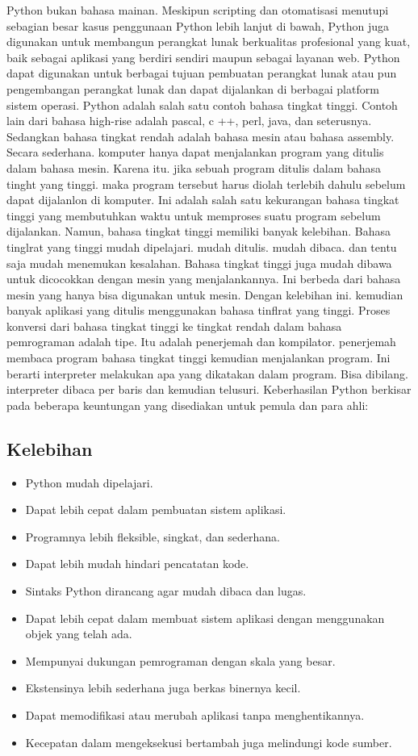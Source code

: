 	Python bukan bahasa mainan. Meskipun scripting dan otomatisasi menutupi sebagian besar kasus penggunaan Python lebih lanjut di bawah, Python juga digunakan untuk membangun perangkat lunak berkualitas profesional yang kuat, baik sebagai aplikasi yang berdiri sendiri maupun sebagai layanan web.
	Python dapat digunakan untuk berbagai tujuan pembuatan perangkat lunak atau pun pengembangan perangkat lunak dan dapat dijalankan di berbagai platform sistem operasi. Python adalah salah satu contoh bahasa tingkat tinggi. 
	Contoh lain dari bahasa high-rise adalah pascal, c ++, perl, java, dan seterusnya. Sedangkan bahasa tingkat rendah adalah bahasa mesin atau bahasa assembly. 
	Secara sederhana. komputer hanya dapat menjalankan program yang ditulis dalam bahasa mesin. Karena itu. jika sebuah program ditulis dalam bahasa tinght yang tinggi. maka program tersebut harus diolah terlebih dahulu sebelum dapat dijalanlon di komputer. 
	Ini adalah salah satu kekurangan bahasa tingkat tinggi yang membutuhkan waktu untuk memproses suatu program sebelum dijalankan. Namun, bahasa tingkat tinggi memiliki banyak kelebihan. Bahasa tinglrat yang tinggi mudah dipelajari. mudah ditulis. mudah dibaca. dan tentu saja mudah menemukan kesalahan. Bahasa tingkat tinggi juga mudah dibawa untuk dicocokkan dengan mesin yang menjalankannya. 
	Ini berbeda dari bahasa mesin yang hanya bisa digunakan untuk mesin. Dengan kelebihan ini. kemudian banyak aplikasi yang ditulis menggunakan bahasa tinflrat yang tinggi. 
	Proses konversi dari bahasa tingkat tinggi ke tingkat rendah dalam bahasa pemrograman adalah tipe. Itu adalah penerjemah dan kompilator. penerjemah membaca program bahasa tingkat tinggi kemudian menjalankan program. 
	Ini berarti interpreter melakukan apa yang dikatakan dalam program. Bisa dibilang. interpreter dibaca per baris dan kemudian telusuri.
	Keberhasilan Python berkisar pada beberapa keuntungan yang disediakan untuk pemula dan para ahli:
	
	\subsection{Kelebihan}
		\begin{itemize}
			\item Python mudah dipelajari.
			\item Dapat lebih cepat dalam pembuatan sistem aplikasi.
			\item Programnya lebih fleksible, singkat, dan sederhana.
			\item Dapat lebih mudah hindari pencatatan kode.
			\item Sintaks Python dirancang agar mudah dibaca dan lugas.
			\item Dapat lebih cepat dalam membuat sistem aplikasi dengan menggunakan objek yang telah ada.
			\item Mempunyai dukungan pemrograman dengan skala yang besar.
			\item Ekstensinya lebih sederhana juga berkas binernya kecil.
			\item Dapat memodifikasi atau merubah aplikasi tanpa menghentikannya.
			\item Kecepatan dalam mengeksekusi bertambah juga melindungi kode sumber.
		\end{itemize}
		
